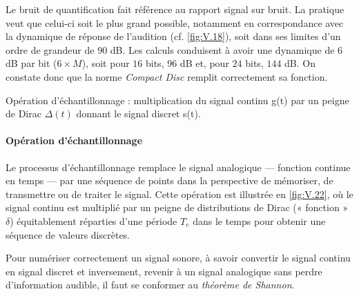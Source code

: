 Le bruit de quantification fait référence au rapport signal sur bruit. La pratique veut que celui-ci soit le plus grand possible, notamment en correspondance avec la dynamique de réponse de l'audition (cf. \cref{fig:V.18}), soit dans ses limites d'un ordre de grandeur de $90$ dB. Les calculs conduisent à avoir une dynamique de $6$ dB par bit ($6 \times M$), soit pour $16$ bits, $96$ dB et, pour $24$ bits, $144$ dB. On constate donc que la norme \textit{Compact Disc} remplit correctement sa fonction.

\begin{marginfigure}
{}
\caption{\label{fig:V.22}Opération d'échantillonnage : multiplication du signal continu g(t) par un peigne de Dirac $\Delta(t)$ donnant le signal discret s(t).}
\end{marginfigure}

\paragraph{Opération d'échantillonnage} Le processus d'échantillonnage remplace le signal analogique --- fonction continue en temps --- par une séquence de points dans la perspective de mémoriser, de transmettre ou de traiter le signal. Cette opération est illustrée en \cref{fig:V.22}, où le signal continu est multiplié par un peigne de distributions de Dirac (« fonction » $\delta$) équitablement réparties d'une période $T_e$ dans le temps pour obtenir une séquence de valeurs discrètes.

Pour numériser correctement un signal sonore, à savoir convertir le signal continu en signal discret et inversement, revenir à un signal analogique sans perdre d'information audible, il faut se conformer au \emph{théorème de Shannon}.

